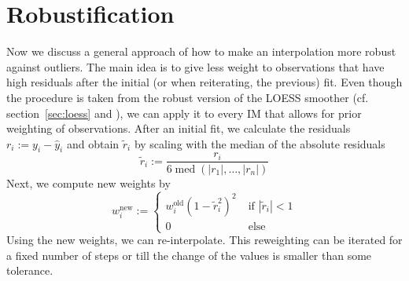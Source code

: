 \section{Robustification}{
	\label{sec:loess_robustify}
	{ %
		Now we discuss a general approach of how to make an interpolation more robust against outliers. The main idea is to give less weight to observations that have high residuals after the initial (or when reiterating, the previous) fit.
		Even though the procedure is taken from the robust version of the LOESS smoother (cf. section~\ref{sec:loess} and \cite{clevelandRobustLocallyWeighted1979}), we can apply it to every {{IM}} that allows for prior weighting of observations.
	}
	{	
		After an initial fit, we calculate the residuals $r_i := y_i - \hat y_i$ and obtain $\tilde r_i$ by scaling with the median of the absolute residuals
		\begin{equation}
			\tilde r_i := \frac{r_i}{6\operatorname{med}\left(|r_1|,\dots,|r_n|\right)}
		\end{equation}
		Next, we compute new weights by
		\begin{equation}
			w_i^\text{new}:=\begin{cases}
				w_i^\text{old} \left(1-\tilde r_i^{2}\right)^{2}\; & \text{if } |\tilde r_i|<1 \\
				0                        & \text{else }
			\end{cases}
			\label{eq:bisquare}
		\end{equation}
		Using the new weights, we can re-interpolate. This reweighting can be iterated for a fixed number of steps or till the change of the values is smaller than some tolerance.
}}
